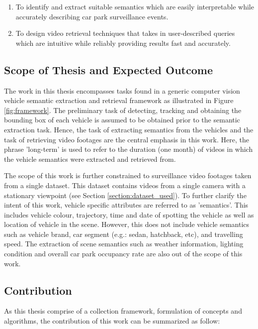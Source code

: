 \begin{enumerate}
\item To identify and extract suitable semantics which are easily interpretable while accurately describing car park surveillance events.
\item To design video retrieval techniques that takes in user-described queries which are intuitive while reliably providing results fast and accurately.
\end{enumerate}

\subsection{Scope of Thesis and Expected Outcome}
\label{subsec:scope}
The work in this thesis encompasses tasks found in a generic computer vision vehicle semantic extraction and retrieval framework as illustrated in Figure \ref{fig:framework}. The preliminary task of detecting, tracking and obtaining the bounding box of each vehicle is assumed to be obtained prior to the semantic extraction task.
Hence, the task of extracting semantics from the vehicles and the task of retrieving video footages are the central emphasis in this work. Here, the phrase 'long-term' is used to refer to the duration (one month) of videos in which the vehicle semantics were extracted and retrieved from.

The scope of this work is further constrained to surveillance video footages taken from a single dataset. This dataset contains videos from a single camera with a stationary viewpoint (see Section \ref{section:dataset_used}). To further clarify the intent of this work, vehicle specific attributes are referred to as 'semantics'. This includes vehicle colour, trajectory, time and date of spotting the vehicle as well as location of vehicle in the scene. However, this does not include vehicle semantics such as vehicle brand, car segment (e.g.: sedan, hatchback, etc), and travelling speed. The extraction of scene semantics such as weather information, lighting condition and overall car park occupancy rate are also out of the scope of this work.


\subsection{Contribution}
As this thesis comprise of a collection framework, formulation of concepts and algorithms, the contribution of this work can be summarized as follow:


